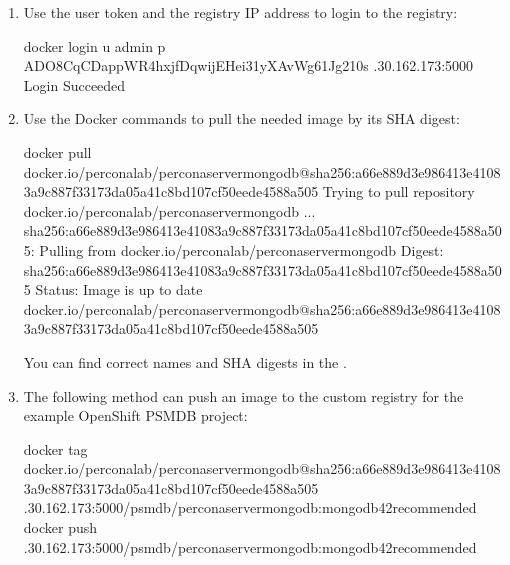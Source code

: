 \documentclass[letterpaper,10pt,english]{sphinxmanual}
\begin{document}
\begin{enumerate}
\item {} 
Use the user token and the registry IP address to login to the
registry:

\begin{sphinxVerbatim}[commandchars=\\\{\}]
\PYGZdl{} docker login \PYGZhy{}u admin \PYGZhy{}p ADO8CqCDappWR4hxjfDqwijEHei31yXAvWg61Jg210s .30.162.173:5000
Login Succeeded
\end{sphinxVerbatim}

\item {} 
Use the Docker commands to pull the needed image by its SHA digest:

\begin{sphinxVerbatim}[commandchars=\\\{\}]
\PYGZdl{} docker pull docker.io/perconalab/percona\PYGZhy{}server\PYGZhy{}mongodb@sha256:a66e889d3e986413e41083a9c887f33173da05a41c8bd107cf50eede4588a505
Trying to pull repository docker.io/perconalab/percona\PYGZhy{}server\PYGZhy{}mongodb ...
sha256:a66e889d3e986413e41083a9c887f33173da05a41c8bd107cf50eede4588a505: Pulling from docker.io/perconalab/percona\PYGZhy{}server\PYGZhy{}mongodb
Digest: sha256:a66e889d3e986413e41083a9c887f33173da05a41c8bd107cf50eede4588a505
Status: Image is up to date  docker.io/perconalab/percona\PYGZhy{}server\PYGZhy{}mongodb@sha256:a66e889d3e986413e41083a9c887f33173da05a41c8bd107cf50eede4588a505
\end{sphinxVerbatim}

You can find correct names and SHA digests in the
{\hyperref[\detokenize{images:custom-registry-images}]{}}.

\item {} 
The following method can push an image to the custom registry
for the example OpenShift PSMDB project:

\begin{sphinxVerbatim}[commandchars=\\\{\}]
\PYGZdl{} docker tag 
    docker.io/perconalab/percona\PYGZhy{}server\PYGZhy{}mongodb@sha256:a66e889d3e986413e41083a9c887f33173da05a41c8bd107cf50eede4588a505 
    .30.162.173:5000/psmdb/percona\PYGZhy{}server\PYGZhy{}mongodb:mongodb42recommended
\PYGZdl{} docker push .30.162.173:5000/psmdb/percona\PYGZhy{}server\PYGZhy{}mongodb:mongodb42recommended
\end{sphinxVerbatim}


\end{enumerate}
\end{document}
